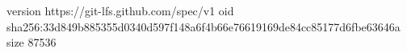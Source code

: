 version https://git-lfs.github.com/spec/v1
oid sha256:33d849b885355d0340d597f148a6f4b66e76619169de84cc85177d6fbe63646a
size 87536
